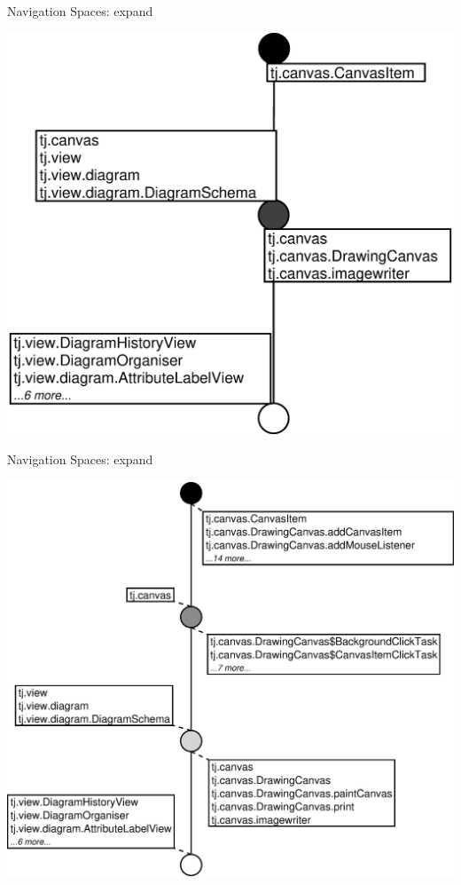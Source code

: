 \documentclass[pdf,prettybox]{prosper}
\begin{document}
\begin{slide}{Navigation Spaces: expand}
 \begin{center}
  \includegraphics[height=0.8 \textheight]{img/callgraph-4.eps}
 \end{center}
\end{slide}

\begin{slide}{Navigation Spaces: expand}
 \begin{center}
  \includegraphics[height=0.8 \textheight]{img/callgraph-5.eps}
 \end{center}
\end{slide}
\end{document}
